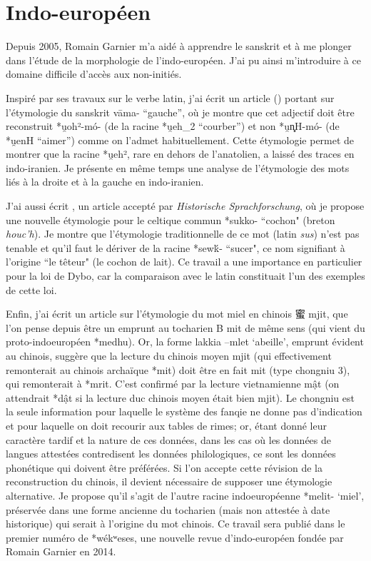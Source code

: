 \documentclass[oldfontcommands,oneside,a4paper,11pt]{memoir}
\newcommand{\ipa}[1]{{\phon #1}} %
\newcommand{\zh}[1]{{\cn #1}}
\begin{document}
\section{Indo-européen}
Depuis 2005, Romain Garnier m'a aidé à apprendre le sanskrit et à me plonger dans l'étude de la morphologie de l'indo-européen. J'ai pu ainsi m'introduire à ce domaine difficile d'accès aux non-initiés.

Inspiré par ses travaux  sur le verbe latin, j'ai écrit un article (\citealt{jacques13vama}) portant sur l'étymologie du sanskrit \ipa{vāma-} ``gauche'', où je montre que cet adjectif doit être reconstruit *u̯oh²-mó- (de la racine *u̯eh_2 ``courber'') et non *u̯n̻H-mó- (de *u̯enH ``aimer'') comme on l'admet habituellement. Cette étymologie permet de montrer que la racine *u̯eh², rare en dehors de l'anatolien, a laissé des traces en indo-iranien. Je présente en même temps une analyse de l'étymologie des mots liés à la droite et à la gauche en indo-iranien. 

J'ai aussi écrit \citet{jacques14cochon}, un article accepté par \textit{Historische Sprachforschung}, où je propose une nouvelle étymologie pour le celtique commun *sukko- ``cochon" (breton \textit{houc'h}). Je montre que l'étymologie traditionnelle de ce mot (latin \textit{sus}) n'est pas tenable et qu'il faut le dériver de la racine *sewḱ- ``sucer", ce nom signifiant à l'origine ``le têteur" (le cochon de lait). Ce travail a une importance en particulier pour la loi de Dybo, car la comparaison avec le latin constituait l'un des exemples de cette loi.

Enfin, j'ai écrit un article sur l'étymologie du mot miel en chinois \zh{蜜} mjit, que l'on pense depuis \citealt{polivanov16mit} être un emprunt au tocharien B \ipa{mit} de même sens (qui vient du proto-indoeuropéen *medhu). Or, la forme lakkia \ipa{--mlet} `abeille', emprunt évident au chinois, suggère que la lecture du chinois moyen \ipa{mjit} (qui effectivement remonterait au chinois archaïque *mit) doit être en fait \ipa{mit} (type chongniu 3), qui remonterait à *mrit. C'est confirmé par la lecture vietnamienne \ipa{mật} (on attendrait *dật si la lecture duc chinois moyen était bien \ipa{mjit}). Le chongniu est la seule information pour laquelle le système des fanqie ne donne pas d'indication et pour laquelle on doit recourir aux tables de rimes; or, étant donné leur caractère tardif et la nature de ces données, dans les cas où les données de langues attestées contredisent les données philologiques, ce sont les données phonétique qui doivent être préférées. Si l'on accepte cette révision de la reconstruction du chinois, il devient nécessaire de supposer une étymologie alternative. Je propose qu'il s'agit de l'autre racine indoeuropéenne *melit- `miel', préservée dans une forme ancienne du tocharien (mais non attestée à date historique) qui serait à l'origine du mot chinois. Ce travail sera publié dans le premier numéro de *wékʷeses, une nouvelle revue d'indo-européen fondée par Romain Garnier en 2014.
\end{document}
